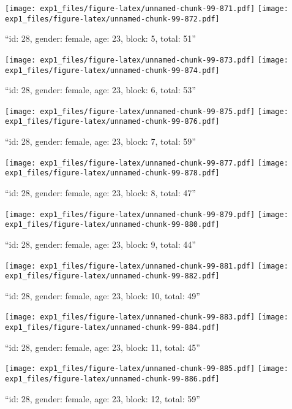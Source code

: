 \documentclass[,]{article}
\begin{document}
\texttt{[image: exp1\_files/figure-latex/unnamed-chunk-99-871.pdf]}
\texttt{[image: exp1\_files/figure-latex/unnamed-chunk-99-872.pdf]}

\newpage
[1] 

``id: 28, gender: female, age: 23, block: 5, total: 51''

\texttt{[image: exp1\_files/figure-latex/unnamed-chunk-99-873.pdf]}
\texttt{[image: exp1\_files/figure-latex/unnamed-chunk-99-874.pdf]}

\newpage
[1] 

``id: 28, gender: female, age: 23, block: 6, total: 53''

\texttt{[image: exp1\_files/figure-latex/unnamed-chunk-99-875.pdf]}
\texttt{[image: exp1\_files/figure-latex/unnamed-chunk-99-876.pdf]}

\newpage
[1] 

``id: 28, gender: female, age: 23, block: 7, total: 59''

\texttt{[image: exp1\_files/figure-latex/unnamed-chunk-99-877.pdf]}
\texttt{[image: exp1\_files/figure-latex/unnamed-chunk-99-878.pdf]}

\newpage
[1] 

``id: 28, gender: female, age: 23, block: 8, total: 47''

\texttt{[image: exp1\_files/figure-latex/unnamed-chunk-99-879.pdf]}
\texttt{[image: exp1\_files/figure-latex/unnamed-chunk-99-880.pdf]}

\newpage
[1] 

``id: 28, gender: female, age: 23, block: 9, total: 44''

\texttt{[image: exp1\_files/figure-latex/unnamed-chunk-99-881.pdf]}
\texttt{[image: exp1\_files/figure-latex/unnamed-chunk-99-882.pdf]}

\newpage
[1] 

``id: 28, gender: female, age: 23, block: 10, total: 49''

\texttt{[image: exp1\_files/figure-latex/unnamed-chunk-99-883.pdf]}
\texttt{[image: exp1\_files/figure-latex/unnamed-chunk-99-884.pdf]}

\newpage
[1] 

``id: 28, gender: female, age: 23, block: 11, total: 45''

\texttt{[image: exp1\_files/figure-latex/unnamed-chunk-99-885.pdf]}
\texttt{[image: exp1\_files/figure-latex/unnamed-chunk-99-886.pdf]}

\newpage
[1] 

``id: 28, gender: female, age: 23, block: 12, total: 59''
\end{document}
